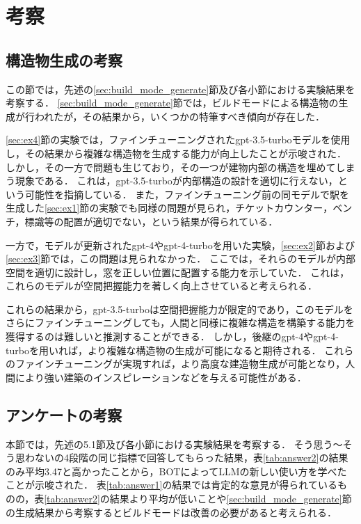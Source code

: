 \chapter{考察}	%
\thispagestyle{plain}   %

\section{構造物生成の考察}
この節では，先述の\ref{sec:build_mode_generate}節及び各小節における実験結果を考察する．
\ref{sec:build_mode_generate}節では，ビルドモードによる構造物の生成が行われたが，その結果から，いくつかの特筆すべき傾向が存在した．

\ref{sec:ex4}節の実験では，ファインチューニングされたgpt-3.5-turboモデルを使用し，その結果から複雑な構造物を生成する能力が向上したことが示唆された．
しかし，その一方で問題も生じており，その一つが建物内部の構造を埋めてしまう現象である．
これは，gpt-3.5-turboが内部構造の設計を適切に行えない，という可能性を指摘している．
また，ファインチューニング前の同モデルで駅を生成した\ref{sec:ex1}節の実験でも同様の問題が見られ，チケットカウンター，ベンチ，標識等の配置が適切でない，という結果が得られている．

一方で，モデルが更新されたgpt-4やgpt-4-turboを用いた実験，\ref{sec:ex2}節および\ref{sec:ex3}節では，この問題は見られなかった．
ここでは，それらのモデルが内部空間を適切に設計し，窓を正しい位置に配置する能力を示していた．
これは，これらのモデルが空間把握能力を著しく向上させていると考えられる．

これらの結果から，gpt-3.5-turboは空間把握能力が限定的であり，このモデルをさらにファインチューニングしても，人間と同様に複雑な構造を構築する能力を獲得するのは難しいと推測することができる．
しかし，後継のgpt-4やgpt-4-turboを用いれば，より複雑な構造物の生成が可能になると期待される．
これらのファインチューニングが実現すれば，より高度な建造物生成が可能となり，人間により強い建築のインスピレーションなどを与える可能性がある．

\section{アンケートの考察}
本節では，先述の5.1節及び各小節における実験結果を考察する．
そう思う～そう思わないの4段階の同じ指標で回答してもらった結果，表\ref{tab:answer2}の結果のみ平均3.47と高かったことから，BOTによってLLMの新しい使い方を学べたことが示唆された．
表\ref{tab:answer1}の結果では肯定的な意見が得られているものの，表\ref{tab:answer2}の結果より平均が低いことや\ref{sec:build_mode_generate}節の生成結果から考察するとビルドモードは改善の必要があると考えられる．